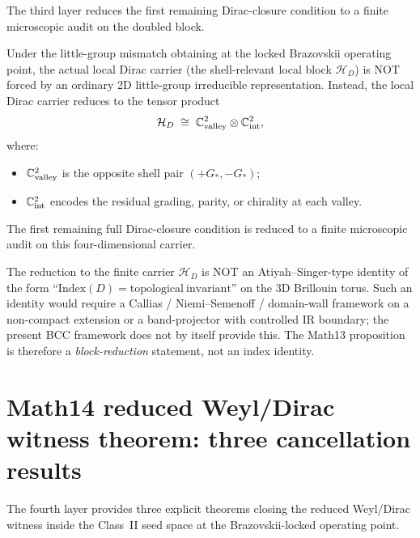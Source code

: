 The third layer reduces the first remaining Dirac-closure condition
to a finite microscopic audit on the doubled block.

\begin{proposition}
\label{prop:Math13-block}
Under the little-group mismatch obtaining at the locked Brazovskii
operating point, the actual local Dirac carrier (the shell-relevant
local block $\mathcal{H}_D$) is NOT forced by an ordinary 2D
little-group irreducible representation. Instead, the local Dirac
carrier reduces to the tensor product
\[
\mathcal{H}_D \;\cong\;
\mathbb{C}^2_{\rm valley} \otimes \mathbb{C}^2_{\rm int},
\]
where:
\begin{itemize}
\item $\mathbb{C}^2_{\rm valley}$ is the opposite shell pair $(+G_*,
-G_*)$;
\item $\mathbb{C}^2_{\rm int}$ encodes the residual grading,
parity, or chirality at each valley.
\end{itemize}
The first remaining full Dirac-closure condition is reduced to a
finite microscopic audit on this four-dimensional carrier.
\end{proposition}

\begin{remark}
\label{rem:no-AS-closed-form}
The reduction to the finite carrier $\mathcal{H}_D$ is NOT an
Atiyah--Singer-type identity of the form ``$\mathrm{Index}(D) =
\mathrm{topological\ invariant}$'' on the 3D Brillouin torus. Such
an identity would require a Callias / Niemi--Semenoff / domain-wall
framework on a non-compact extension or a band-projector with
controlled IR boundary; the present BCC framework does not by itself
provide this. The Math13 proposition is therefore a
\emph{block-reduction} statement, not an index identity.
\end{remark}

\section{Math14 reduced Weyl/Dirac witness theorem: three
cancellation results}\label{sec:Math14}

The fourth layer provides three explicit theorems closing the
reduced Weyl/Dirac witness inside the Class~II seed space at the
Brazovskii-locked operating point.


